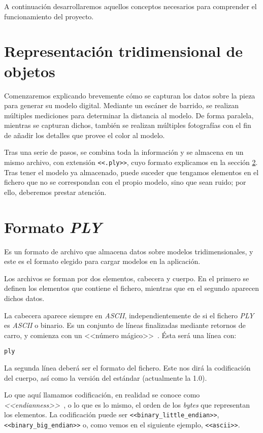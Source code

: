 
A continuación desarrollaremos aquellos conceptos necesarios para comprender el funcionamiento del proyecto.

\section{Representación tridimensional de objetos}
Comenzaremos explicando brevemente cómo se capturan los datos sobre la pieza para generar su modelo digital. Mediante un escáner de barrido, se realizan múltiples mediciones para determinar la distancia al modelo. De forma paralela, mientras se capturan dichos, también se realizan múltiples fotografías con el fin de añadir los detalles que provee el color al modelo.

Tras una serie de pasos, se combina toda la información y se almacena en un mismo archivo, con extensión \texttt{<<.ply>>}, cuyo formato explicamos en la sección \ref{sec:formato-ply}. Tras tener el modelo ya almacenado, puede suceder que tengamos elementos en el fichero que no se correspondan con el propio modelo, sino que sean ruido; por ello, deberemos prestar atención.

\section{Formato \textit{PLY}}\label{sec:formato-ply}
Es un formato de archivo que almacena datos sobre modelos tridimensionales, y este es el formato elegido para cargar modelos en la aplicación.

Los archivos se forman por dos elementos, cabecera y cuerpo. En el primero se definen los elementos que contiene el fichero, mientras que en el segundo aparecen dichos datos.

La cabecera aparece siempre en \textit{ASCII}, independientemente de si el fichero \textit{PLY} es \textit{ASCII} o binario. Es un conjunto de líneas finalizadas mediante retornos de carro, y comienza con un <<número mágico>>~\cite{wiki:Magic-number}. Ésta será una línea con:

\verb|ply|

La segunda línea deberá ser el formato del fichero. Este nos dirá la codificación del cuerpo, así como la versión del estándar (actualmente la 1.0).

Lo que aquí llamamos codificación, en realidad se conoce como \textit{<<endianness>>}~\cite{wiki:endianness}, o lo que es lo mismo, el orden de los \textit{bytes} que representan los elementos. La codificación puede ser \texttt{<<binary\_little\_endian>>}, \texttt{<<binary\_big\_endian>>} o, como vemos en el siguiente ejemplo, \texttt{<<ascii>>}.


